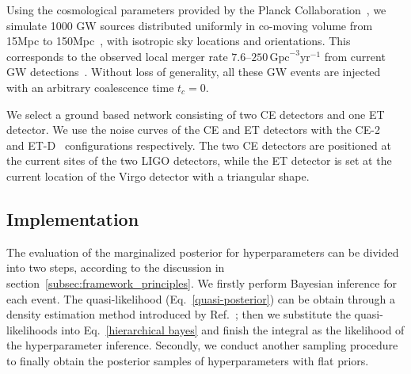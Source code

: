 \documentclass[a4paper,11pt]{article}
\begin{document}
Using the cosmological parameters provided by the Planck Collaboration~\cite{Planck:2018vyg}, we simulate 1000 GW sources distributed uniformly in co-moving volume from 15Mpc to 150Mpc~\cite{Fishbach:2018edt,KAGRA:2021duu}, with isotropic sky locations and orientations. This corresponds to the observed local merger rate $7.6$--$250\,\mathrm{Gpc}^{-3}\mathrm{yr}^{-1}$ from current GW detections~\cite{LIGOScientific:2025pvj,LIGOScientific:2020aai}. Without loss of generality, all these GW events are injected with an arbitrary coalescence time $t_c=0$.

We select a ground based network consisting of two CE detectors and one ET detector. We use the noise curves of the CE and ET detectors with the CE-2~\cite{Reitze:2019iox,Reitze:2019dyk} and ET-D~\cite{Punturo:2010zz,Hild:2010id,Sathyaprakash:2012jk} configurations respectively. The two CE detectors are positioned at the current sites of the two LIGO detectors, while the ET detector is set at the current location of the Virgo detector with a triangular shape. 

\subsection{Implementation}
\label{subsec:simulation_implementation}

The evaluation of the marginalized posterior for hyperparameters can be divided into two steps, according to the discussion in section~\ref{subsec:framework_principles}. We firstly perform Bayesian inference for each event. The quasi-likelihood (Eq.~\eqref{quasi-posterior}) can be obtain through a density estimation method introduced by Ref.~\cite{Talbot:2020oeu}; 
then we substitute the quasi-likelihoods into Eq.~\eqref{hierarchical bayes} and finish the integral as the likelihood of the hyperparameter inference. Secondly, we conduct another sampling procedure to finally obtain the posterior samples of hyperparameters with flat priors. 
\end{document}
